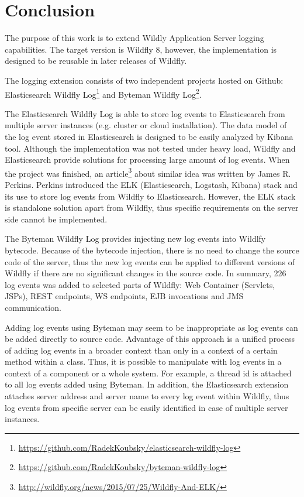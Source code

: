 \documentclass[12pt,oneside]{fithesis2}
\begin{document}
\chapter{Conclusion}
\label{conclusion}
The purpose of this work is to extend Wildly Application Server logging capabilities. The target version is Wildfly 8, however, the implementation is designed to be reusable in later releases of Wildfly.

The logging extension consists of two independent projects hosted on Github: Elasticsearch Wildfly Log\footnote{\url{https://github.com/RadekKoubsky/elasticsearch-wildfly-log}} and Byteman Wildfly Log\footnote{\url{https://github.com/RadekKoubsky/byteman-wildfly-log}}.

The Elasticsearch Wildfly Log is able to store log events to Elasticsearch from multiple server instances (e.g. cluster or cloud installation). The data model of the log event stored in Elasticsearch is designed to be easily analyzed by Kibana tool. Although the implementation was not tested under heavy load, Wildfly and Elasticsearch provide solutions for processing large amount of log events. When the project was finished, an article\footnote{\url{http://wildfly.org/news/2015/07/25/Wildfly-And-ELK/}} about similar idea was written by James R. Perkins. Perkins introduced the ELK (Elasticsearch, Logstash, Kibana) stack and its use to store log events from Wildfly to Elasticsearch. However, the ELK stack is standalone solution apart from Wildfly, thus specific requirements on the server side cannot be implemented.

The Byteman Wildfly Log provides injecting new log events into Wildlfy bytecode. Because of the bytecode injection, there is no need to change the source code of the server, thus the new log events can be applied to different versions of Wildfly if there are no significant changes in the source code. In summary, 226 log events was added to selected parts of Wildfly: Web Container (Servlets, JSPs), REST endpoints, WS endpoints, EJB invocations and JMS communication.

Adding log events using Byteman may seem to be inappropriate as log events can be added directly to source code. Advantage of this approach is a unified process of adding log events in a broader context than only in a context of a certain method within a class. Thus, it is possible to manipulate with log events in a context of a component or a whole system. For example, a thread id is attached to all log events added using Byteman. In addition, the Elasticsearch extension attaches server address and server name to every log event within Wildfly, thus log events from specific server can be easily identified in case of multiple server instances.
\end{document}
